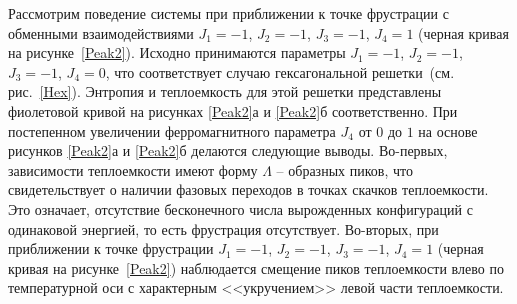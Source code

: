 \documentclass[utf8,12pt]{jetp}
\begin{document}
Рассмотрим поведение системы при приближении к точке фрустрации с обменными взаимодействиями $J_1 = -1$, $J_2 = -1$, $J_3 = -1$, $J_4 = 1$ (черная кривая на рисунке~\ref{Peak2}). Исходно принимаются параметры $J_1 = -1$, $J_2 = -1$, $J_3 = -1$, $J_4 = 0$, что соответствует случаю гексагональной решетки~(см. рис.~\ref{Hex}). Энтропия и теплоемкость для этой решетки представлены фиолетовой кривой на рисунках \ref{Peak2}а и \ref{Peak2}б соответственно. При постепенном увеличении ферромагнитного параметра $J_4$ от $0$ до $1$ на основе рисунков \ref{Peak2}а и \ref{Peak2}б делаются следующие выводы. Во-первых, зависимости теплоемкости имеют форму $\Lambda$ -- образных пиков, что свидетельствует о наличии фазовых переходов в точках скачков теплоемкости. Это означает, отсутствие бесконечного числа вырожденных конфигураций с одинаковой энергией, то есть фрустрация отсутствует. Во-вторых, при приближении к точке фрустрации $J_1 = -1$, $J_2 = -1$, $J_3 = -1$, $J_4 = 1$ (черная кривая на рисунке~\ref{Peak2}) наблюдается смещение пиков теплоемкости влево по температурной оси с характерным <<укручением>> левой части теплоемкости.
\end{document}
